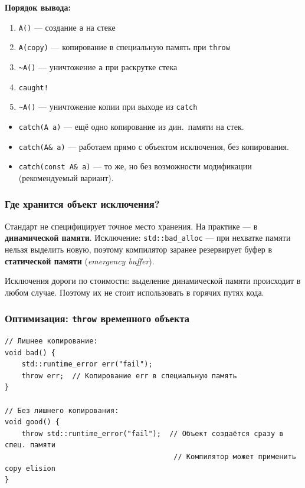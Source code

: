 \documentclass[a4paper,12pt]{article}
\begin{document}
\textbf{Порядок вывода:}
\begin{enumerate}
    \item \texttt{A()} --- создание \texttt{a} на стеке
    \item \texttt{A(copy)} --- копирование в специальную память при \texttt{throw}
    \item \texttt{\textasciitilde A()} --- уничтожение \texttt{a} при раскрутке стека
    \item \texttt{caught!}
    \item \texttt{\textasciitilde A()} --- уничтожение копии при выходе из \texttt{catch}
\end{enumerate}

\medskip
\begin{itemize}
    \item \texttt{catch(A a)} --- ещё одно копирование из дин.\ памяти на стек.
    \item \texttt{catch(A\& a)} --- работаем прямо с объектом исключения, без копирования.
    \item \texttt{catch(const A\& a)} --- то же, но без возможности модификации
          (рекомендуемый вариант).
\end{itemize}

\subsubsection{Где хранится объект исключения?}

Стандарт не специфицирует точное место хранения. На практике ---
в \textbf{динамической памяти}. Исключение: \texttt{std::bad\_alloc} ---
при нехватке памяти нельзя выделить новую, поэтому компилятор заранее
резервирует буфер в \textbf{статической памяти}
(\textit{emergency buffer}).

Исключения дороги по стоимости: выделение динамической памяти происходит
в любом случае. Поэтому их не стоит использовать в горячих путях кода.

\subsubsection{Оптимизация: \texttt{throw} временного объекта}

\begin{lstlisting}
// Лишнее копирование:
void bad() {
    std::runtime_error err("fail");
    throw err;  // Копирование err в специальную память
}

// Без лишнего копирования:
void good() {
    throw std::runtime_error("fail");  // Объект создаётся сразу в спец. памяти
                                        // Компилятор может применить copy elision
}
\end{lstlisting}
\end{document}
